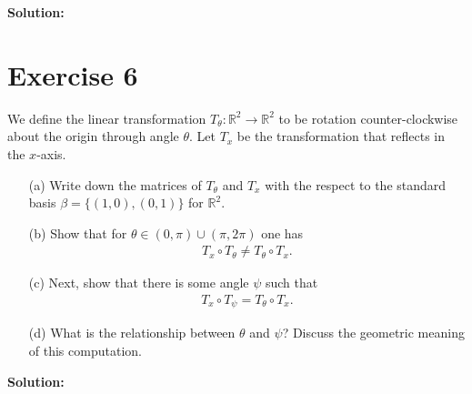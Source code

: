 \documentclass{article}
\begin{document}
\textbf{Solution: }\\



\newpage

\section*{Exercise 6}
We define the linear transformation $T_{\theta} : \mathbb{R}^2 \to \mathbb{R}^2$ to be rotation counter-clockwise about the origin through angle $\theta$. Let $T_x$ be the transformation that reflects in the $x$-axis.

\begin{itemize}
    \item[(a)] Write down the matrices of $T_{\theta}$ and $T_x$ with the respect to the standard basis $\beta = \{(1,0),(0,1)\}$ for $\mathbb{R}^2$.

    \item[(b)] Show that for $\theta \in (0,\pi) \cup (\pi,2\pi)$ one has
    \begin{align*}
    T_x \circ T_{\theta} \neq T_{\theta} \circ T_x.
    \end{align*}

    \item[(c)] Next, show that there is some angle $\psi$ such that
    \begin{align*}
    T_x \circ T_{\psi} = T_{\theta} \circ T_x.
    \end{align*}

    \item[(d)] What is the relationship between $\theta$ and $\psi$? Discuss the geometric meaning of this computation.
\end{itemize}

\textbf{Solution: }\\



\newpage
\end{document}
